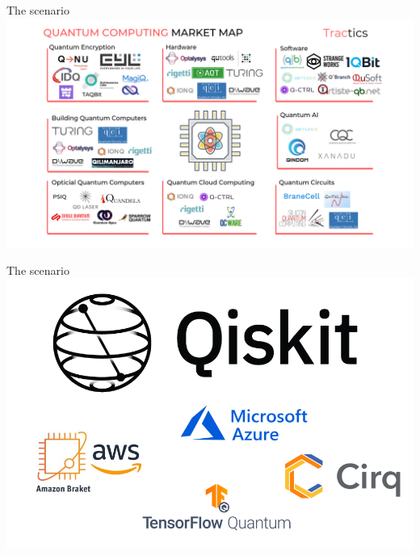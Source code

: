 \begin{frame}{The scenario}
    \includegraphics[width=\textwidth]{img/lec1/qc_landscape.png}
\end{frame}


\begin{frame}{The scenario}
    \includegraphics[width=\textwidth]{img/lec1/qc_landscape_zoom.png}
\end{frame}